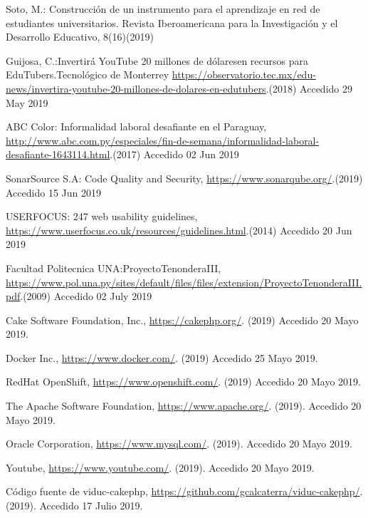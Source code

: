 \documentclass[runningheads]{llncs}
\begin{document}
\begin{thebibliography}{20}
Soto, M.: Construcción de un instrumento para el aprendizaje en red de estudiantes universitarios. Revista Iberoamericana para la Investigación y el Desarrollo Educativo, 8(16)(2019)

Guijosa, C.:Invertirá YouTube 20 millones de dólaresen recursos para EduTubers.Tecnológico de Monterrey \url{https://observatorio.tec.mx/edu-news/invertira-youtube-20-millones-de-dolares-en-edutubers}.(2018) Accedido 29 May 2019

ABC Color: Informalidad laboral desafiante en el Paraguay, \url{http://www.abc.com.py/especiales/fin-de-semana/informalidad-laboral-desafiante-1643114.html}.(2017) Accedido 02 Jun 2019

SonarSource S.A: Code Quality and Security, \url{https://www.sonarqube.org/}.(2019) Accedido 15 Jun 2019

USERFOCUS: 247 web usability guidelines, \url{https://www.userfocus.co.uk/resources/guidelines.html}.(2014) Accedido 20 Jun 2019

Facultad Politecnica UNA:ProyectoTenonderaIII, \url{https://www.pol.una.py/sites/default/files/files/extension/ProyectoTenonderaIII.pdf}.(2009) Accedido 02 July 2019

Cake Software Foundation, Inc., \url{https://cakephp.org/}. (2019) Accedido 20 Mayo 2019.

Docker Inc., \url{https://www.docker.com/}. (2019) Accedido 25 Mayo 2019.

RedHat OpenShift, \url{https://www.openshift.com/}. (2019) Accedido 20 Mayo 2019.

The Apache Software Foundation, \url{https://www.apache.org/}. (2019). Accedido 20 Mayo 2019.

Oracle Corporation, \url{https://www.mysql.com/}. (2019). Accedido 20 Mayo 2019.

Youtube, \url{https://www.youtube.com/}. (2019). Accedido 20 Mayo 2019.

Código fuente de viduc-cakephp, \url{https://github.com/gcalcaterra/viduc-cakephp/}. (2019). Accedido 17 Julio 2019.



\end{thebibliography}
\end{document}
